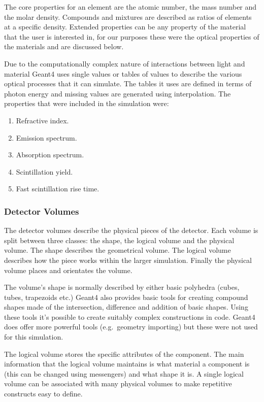The core properties for an element are the atomic number, the mass number and the molar density. Compounds and mixtures are described as ratios of elements at a specific density. Extended properties can be any property of the material that the user is interested in, for our purposes these were the optical properties of the materials and are discussed below.

Due to the computationally complex nature of interactions between light and material Geant4 uses single values or tables of values to describe the various optical processes that it can simulate. The tables it uses are defined in terms of photon energy and missing values are generated using interpolation. The properties that were included in the simulation were:
\begin{enumerate}
  \item Refractive index.
  \item Emission spectrum.
  \item Absorption spectrum. 
  \item Scintillation yield.
  \item Fast scintillation rise time.
\end{enumerate}

\subsubsection{Detector Volumes} %
\label{sub:detector_volumes}
The detector volumes describe the physical pieces of the detector. Each volume is split between three classes: the shape, the logical volume and the physical volume. The shape describes the geometrical volume. The logical volume describes how the piece works within the larger simulation. Finally the physical volume places and orientates the volume. 

The volume's shape is normally described by either basic polyhedra (cubes, tubes, trapezoids etc.) Geant4 also provides basic tools for creating compound shapes made of the intersection, difference and addition of basic shapes. Using these tools it's possible to create suitably complex constructions in code. Geant4 does offer more powerful tools (e.g.\ geometry importing) but these were not used for this simulation.

The logical volume stores the specific attributes of the component. The main information that the logical volume maintains is what material a component is (this can be changed using messengers) and what shape it is. A single logical volume can be associated with many physical volumes to make repetitive constructs easy to define.

